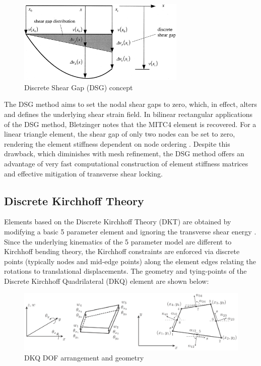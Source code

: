 \begin{figure}[H]
	\centering
	\def\svgwidth{\columnwidth}
	\includegraphics[width=8cm]{images/DSG.png}
	\caption{Discrete Shear Gap (DSG) concept \cite{Ble00}}
	\label{ansexample}
\end{figure}

The DSG method aims to set the nodal shear gaps to zero, which, in effect, alters and defines the underlying shear strain field. In bilinear rectangular applications of the DSG method, Bletzinger \cite{Ble00} notes that the MITC4 element is recovered. For a linear triangle element, the shear gap of only two nodes can be set to zero, rendering the element stiffness dependent on node ordering \cite{Ble00}. Despite this drawback, which diminishes with mesh refinement, the DSG method offers an advantage of very fast computational construction of element stiffness matrices and effective mitigation of transverse shear locking.

\subsection{Discrete Kirchhoff Theory}

Elements based on the Discrete Kirchhoff Theory (DKT) are obtained by modifying a basic 5 parameter element and ignoring the transverse shear energy \cite{Batoz1980}. Since the underlying kinematics of the 5 parameter model are different to Kirchhoff bending theory, the Kirchhoff constraints are enforced via discrete points (typically nodes and mid-edge points) along the element edges relating the rotations to translational displacements. The geometry and tying-points of the Discrete Kirchhoff Quadrilateral (DKQ) element are shown below:

\begin{figure}[H]
	\centering
	\def\svgwidth{\columnwidth}
	\includegraphics[width=15cm]{images/8nodeseren.png}
	\caption{DKQ DOF arrangement and geometry \cite{Bar12}}
	\label{DKQlayout}
\end{figure}

